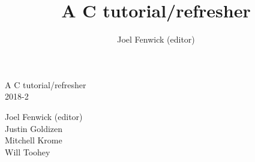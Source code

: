 \documentclass[a4paper,10pt]{book}
\begin{document}
\title{A C tutorial/refresher}
\author{Joel Fenwick (editor)}
\pagestyle{empty}

\vspace*{6cm}
\begin{center}
{\LARGE A C tutorial/refresher}\\
\vspace*{5mm}
{\large 2018-2}\\
\end{center}
\vfill
\begin{flushright}
Joel Fenwick (editor)\\
Justin Goldizen\\
Mitchell Krome\\
Will Toohey 
\end{flushright}
\vfill
\vfill

\tableofcontents
{}
\lstset{language=C}












\appendix

\end{document}
